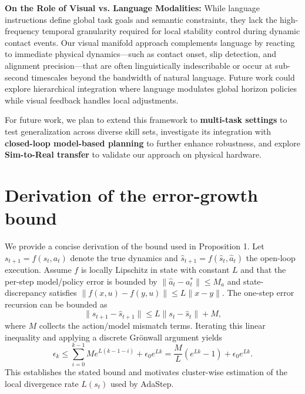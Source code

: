 \documentclass[conference]{IEEEtran}
\begin{document}
\textbf{On the Role of Visual vs. Language Modalities:} 
While language instructions define global task goals and semantic constraints, they lack the high-frequency temporal granularity required for local stability control during dynamic contact events. Our visual manifold approach complements language by reacting to immediate physical dynamics---such as contact onset, slip detection, and alignment precision---that are often linguistically indescribable or occur at sub-second timescales beyond the bandwidth of natural language. Future work could explore hierarchical integration where language modulates global horizon policies while visual feedback handles local adjustments.

For future work, we plan to extend this framework to \textbf{multi-task settings} to test generalization across diverse skill sets, investigate its integration with \textbf{closed-loop model-based planning} to further enhance robustness, and explore \textbf{Sim-to-Real transfer} to validate our approach on physical hardware.

\appendices
\section{Derivation of the error-growth bound}
We provide a concise derivation of the bound used in Proposition 1. Let $s_{t+1}=f(s_t,a_t)$ denote the true dynamics and $\hat s_{t+1}=f(\hat s_t,\hat a_t)$ the open-loop execution. Assume $f$ is locally Lipschitz in state with constant $L$ and that the per-step model/policy error is bounded by $\|\hat a_t-a_t^*\|\le M_a$ and state-discrepancy satisfies $\|f(x,u)-f(y,u)\|\le L\|x-y\|$. The one-step error recursion can be bounded as
\[
\|s_{t+1}-\hat s_{t+1}\| \le L\|s_t-\hat s_t\| + M,\]
where $M$ collects the action/model mismatch terms. Iterating this linear inequality and applying a discrete Gr\"onwall argument yields
\[
\epsilon_k \le \sum_{i=0}^{k-1} M e^{L (k-1-i)} + \epsilon_0 e^{L k} = \frac{M}{L}(e^{Lk}-1)+\epsilon_0 e^{Lk}.
\]
This establishes the stated bound and motivates cluster-wise estimation of the local divergence rate $L(s_t)$ used by AdaStep.



\end{document}

